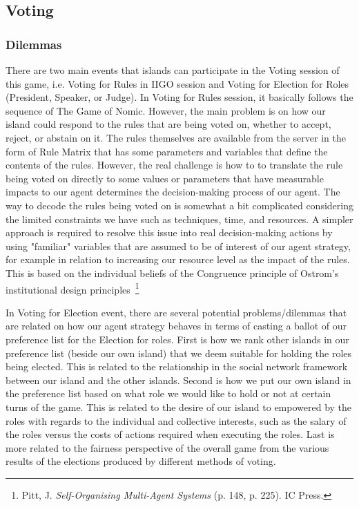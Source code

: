\subsection{Voting} \label{subsec:Team6_Voting}
\subsubsection{Dilemmas} \label{subsubsec:Team6_Voting:Dilemma}
There are two main events that islands can participate in the Voting session of this game, i.e. Voting for Rules in IIGO session and Voting for Election for Roles (President, Speaker, or Judge). In Voting for Rules session, it basically follows the sequence of The Game of Nomic. However, the main problem is on how our island could respond to the rules that are being voted on, whether to accept, reject, or abstain on it. The rules themselves are available from the server in the form of Rule Matrix that has some parameters and variables that define the contents of the rules. However, the real challenge is how to to translate the rule being voted on directly to some values or parameters that have measurable impacts to our agent determines the decision-making process of our agent. The way to decode the rules being voted on is somewhat a bit complicated considering the limited constraints we have such as techniques, time, and resources. A simpler approach is required to resolve this issue into real decision-making actions by using "familiar" variables that are assumed to be of interest of our agent strategy, for example in relation to increasing our resource level as the impact of the rules. This is based on the individual beliefs of the Congruence principle of Ostrom's institutional design principles~\footnote{Pitt, J. \textit{Self-Organising Multi-Agent Systems} (p. 148, p. 225). IC Press.}

In Voting for Election event, there are several potential problems/dilemmas that are related on how our agent strategy behaves in terms of casting a ballot of our preference list for the Election for roles. First is how we rank other islands in our preference list (beside our own island) that we deem suitable for holding the roles being elected. This is related to the relationship in the social network framework between our island and the other islands. Second is how we put our own island in the preference list based on what role we would like to hold or not at certain turns of the game. This is related to the desire of our island to empowered by the roles with regards to the individual and collective interests, such as the salary of the roles versus the costs of actions required when executing the roles. Last is more related to the fairness perspective of the overall game from the various results of the elections produced by different methods of voting.

